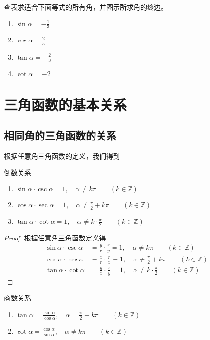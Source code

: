 \begin{ex}
    查表求适合下面等式的所有角，并图示所求角的终边。
    \begin{multicols}{2}
\begin{enumerate}
    \item $\sin\alpha =-\frac{1}{3}$
    \item $\cos\alpha =\frac{2}{5}$
    \item $\tan\alpha =-\frac{2}{3}$
    \item $\cot\alpha=-2$
\end{enumerate} 
    \end{multicols}
\end{ex}

\section{三角函数的基本关系}
\subsection{相同角的三角函数的关系}
根据任意角三角函数的定义，我们得到

\begin{blk}{倒数关系}
\begin{enumerate}
    \item $\sin\alpha\cdot \csc\alpha=1,\quad \alpha\ne k\pi\qquad (k\in\mathbb{Z})$
    \item $\cos\alpha\cdot \sec\alpha=1,\quad \alpha\ne \frac{\pi}{2}+k\pi\qquad (k\in\mathbb{Z})$
    \item $\tan\alpha\cdot \cot \alpha=1,\quad \alpha\ne k\cdot \frac{\pi}{2}\qquad (k\in\mathbb{Z})$
\end{enumerate}
\end{blk}

\begin{proof}
    根据任意角三角函数定义得
\[\begin{split}
    \sin\alpha\cdot \csc\alpha&=\frac{y}{r}\cdot\frac{r}{y}=1,\quad \alpha\ne k\pi\qquad (k\in\mathbb{Z})\\
    \cos\alpha\cdot \sec\alpha&=\frac{x}{r}\cdot \frac{r}{x}=1,\quad \alpha\ne \frac{\pi}{2}+k\pi\qquad (k\in\mathbb{Z})\\
    \tan\alpha\cdot \cot \alpha&=\frac{y}{x}\cdot \frac{x}{y}=1,\quad \alpha\ne k\cdot \frac{\pi}{2}\qquad (k\in\mathbb{Z})
\end{split}\]
\end{proof}

\begin{blk}{商数关系}
\begin{enumerate}
    \item $\tan\alpha=\frac{\sin\alpha}{\cos\alpha},\quad \alpha=\frac{\pi}{2}+k\pi\qquad (k\in\mathbb{Z})$
    \item $\cot\alpha=\frac{\cos\alpha}{\sin\alpha},\quad \alpha\ne k\pi\qquad (k\in\mathbb{Z})$
\end{enumerate}
\end{blk}

